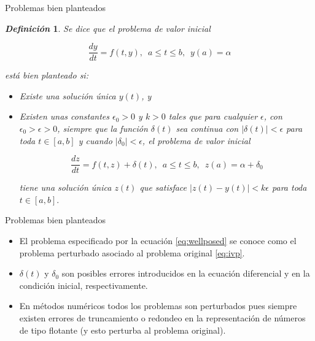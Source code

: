 \documentclass{beamer}
\newtheorem{defi}{\textit{\textbf{Definici\'on}}}
\begin{document}
\begin{frame}{Problemas bien planteados}

{\footnotesize 
	
\begin{defi}
Se dice que el problema de valor inicial

\begin{equation}\label{eq:ivp}
\dfrac{d y}{d t} = f(t,y), \,\,\, a \leq t \leq b, \,\,\, y(a) = \alpha
\end{equation}

está bien planteado si:

\begin{itemize}
	\item Existe una solución única $y(t)$, y
	\item Existen unas constantes $\epsilon_0 > 0$ y $k > 0$ tales que para cualquier $\epsilon$, con $\epsilon_0 > \epsilon > 0$, siempre que la función $\delta(t)$ sea continua con $|\delta(t)| < \epsilon$ para toda $t \in [a,b]$ y cuando $|\delta_0| < \epsilon$, el problema de valor inicial 
	
	\begin{equation}\label{eq:wellposed}
	\dfrac{d z}{d t} = f(t,z) + \delta(t), \,\,\, a \leq t \leq b, \,\,\, z(a) = \alpha + \delta_0
	\end{equation}
	
	tiene una solución única $z(t)$ que satisface $	|z(t) - y(t)| < k \epsilon$ para toda $ t \in [a,b].$

\end{itemize}

\end{defi}
}

\end{frame}

\begin{frame}{Problemas bien planteados}

\begin{itemize}[<+->]
\item El problema especificado por la ecuación \eqref{eq:wellposed} se conoce como el problema perturbado asociado al problema original \eqref{eq:ivp}.

\item $\delta(t)$ y $\delta_0$ son posibles errores introducidos en la ecuación diferencial y en la condición inicial, respectivamente.

\item En métodos numéricos todos los problemas son perturbados pues siempre existen errores de truncamiento o redondeo en la representación de números de tipo flotante (y esto perturba al problema original).
\end{itemize}
\end{frame}
\end{document}
